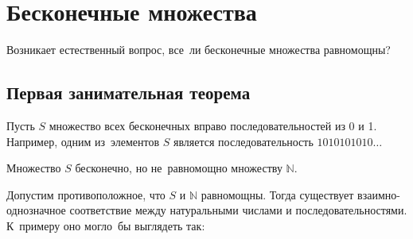 \documentclass[12pt, a4paper]{article}
\begin{document}
 

\section{Бесконечные множества} 

Возникает естественный вопрос, все~ли бесконечные множества равномощны?

\subsection{Первая занимательная теорема}

Пусть $S$ множество всех бесконечных вправо последовательностей из 0 и 1. Например, одним из~элементов $S$ является последовательность $1010101010\ldots$

Множество $S$ бесконечно, но не~равномощно множеству $\mathbb{N}$.

Допустим противоположное, что $S$ и $\mathbb{N}$ равномощны. Тогда существует взаимно-однозначное соответствие между натуральными числами и последовательностями. К~примеру оно могло~бы выглядеть так:
\end{document}
